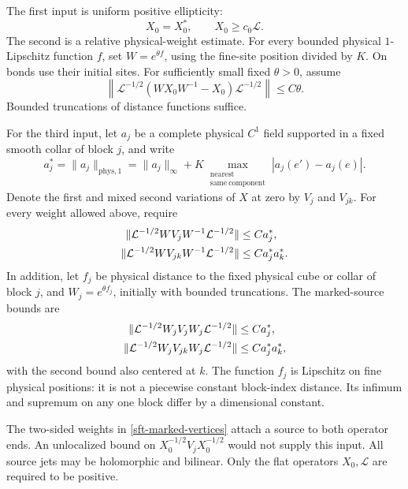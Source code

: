 \documentclass[11pt]{article}
\theoremstyle{remark}
\begin{document}
The first input is uniform positive ellipticity:
\begin{equation}
 X_0=X_0^*,\qquad X_0\ge c_0\mathcal L.
 \label{sft-ellipticity}
\end{equation}
The second is a relative physical-weight estimate. For every bounded
physical \(1\)-Lipschitz function \(f\), set \(W=e^{\theta f}\),
using the fine-site position divided by \(K\). On bonds use their
initial sites. For sufficiently small fixed \(\theta>0\), assume
\begin{equation}
 \left\|\mathcal L^{-1/2}
       (WX_0W^{-1}-X_0)\mathcal L^{-1/2}\right\|
       \le C\theta .
 \label{sft-weighted-input}
\end{equation}
Bounded truncations of distance functions suffice.

For the third input, let \(a_j\) be a complete physical \(C^1\) field
supported in a fixed smooth collar of block \(j\), and write
\begin{equation}
 a_j^*=\|a_j\|_{\mathrm{phys},1}
 =\|a_j\|_\infty+
 K\max_{\substack{\mathrm{nearest}\\\mathrm{same\ component}}}
       |a_j(e')-a_j(e)|.
 \label{sft-source-norm}
\end{equation}
Denote the first and mixed second variations of \(X\) at zero by
\(V_j\) and \(V_{jk}\). For every weight allowed above, require
\begin{align}
 \|\mathcal L^{-1/2}WV_jW^{-1}\mathcal L^{-1/2}\|
     &\le Ca_j^*,\notag\\
 \|\mathcal L^{-1/2}WV_{jk}W^{-1}\mathcal L^{-1/2}\|
     &\le Ca_j^*a_k^*.
 \label{sft-conjugated-vertices}
\end{align}
In addition, let \(f_j\) be physical distance to the fixed physical
cube or collar of block \(j\), and \(W_j=e^{\theta f_j}\), initially
with bounded truncations. The marked-source bounds are
\begin{align}
 \|\mathcal L^{-1/2}W_jV_jW_j\mathcal L^{-1/2}\|
     &\le Ca_j^*,\notag\\
 \|\mathcal L^{-1/2}W_jV_{jk}W_j\mathcal L^{-1/2}\|
     &\le Ca_j^*a_k^*,
 \label{sft-marked-vertices}
\end{align}
with the second bound also centered at \(k\).
The function \(f_j\) is Lipschitz on fine physical positions:
it is not a piecewise constant block-index distance. Its infimum
and supremum on any one block differ by a dimensional constant.

The two-sided weights in \eqref{sft-marked-vertices} attach a source
to both operator ends. An unlocalized bound on
\(X_0^{-1/2}V_jX_0^{-1/2}\) would not supply this input.
All source jets may be holomorphic and bilinear. Only the flat
operators \(X_0,\mathcal L\) are required to be positive.
\end{document}
